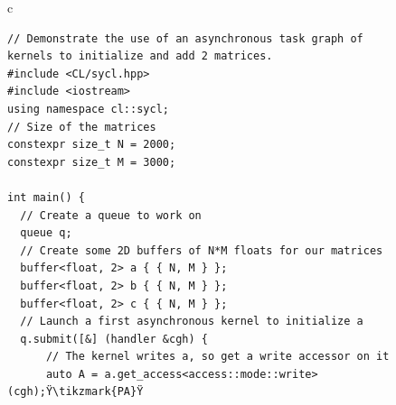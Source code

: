 \documentclass[sigplan, review, authordraft]{acmart}
\begin{document}
\begin{figure}
  \begin{tabular}{c}
    \begin{lstlisting}[basicstyle=\scriptsize,name=example]
// Demonstrate the use of an asynchronous task graph of kernels to initialize and add 2 matrices.
#include <CL/sycl.hpp>
#include <iostream>
using namespace cl::sycl;
// Size of the matrices
constexpr size_t N = 2000;
constexpr size_t M = 3000;

int main() {
  // Create a queue to work on
  queue q;
  // Create some 2D buffers of N*M floats for our matrices
  buffer<float, 2> a { { N, M } };
  buffer<float, 2> b { { N, M } };
  buffer<float, 2> c { { N, M } };
  // Launch a first asynchronous kernel to initialize a
  q.submit([&] (handler &cgh) {
      // The kernel writes a, so get a write accessor on it
      auto A = a.get_access<access::mode::write>(cgh);Ÿ\tikzmark{PA}Ÿ


\end{lstlisting}
\end{tabular}
\end{figure}
\end{document}
